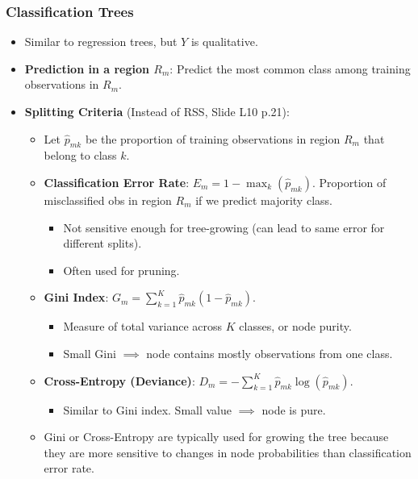 \documentclass[12pt,a4paper]{article}
\begin{document}
\begin{itemize}
    \subsubsection{Classification Trees }
        \begin{itemize}
            \item Similar to regression trees, but $Y$ is qualitative.
            \item \textbf{Prediction in a region $R_m$}: Predict the most common class among training observations in $R_m$.
            \item \textbf{Splitting Criteria} (Instead of RSS, Slide L10 p.21):
                \begin{itemize}
                    \item Let $\hat{p}_{mk}$ be the proportion of training observations in region $R_m$ that belong to class $k$.
                    \item \textbf{Classification Error Rate}: $E_m = 1 - \max_k (\hat{p}_{mk})$. Proportion of misclassified obs in region $R_m$ if we predict majority class.
                        \begin{itemize}
                            \item Not sensitive enough for tree-growing (can lead to same error for different splits).
                            \item Often used for pruning.
                        \end{itemize}
                    \item \textbf{Gini Index}: $G_m = \sum_{k=1}^K \hat{p}_{mk} (1 - \hat{p}_{mk})$.
                        \begin{itemize}
                            \item Measure of total variance across $K$ classes, or node purity.
                            \item Small Gini $\implies$ node contains mostly observations from one class.
                        \end{itemize}
                    \item \textbf{Cross-Entropy (Deviance)}: $D_m = -\sum_{k=1}^K \hat{p}_{mk} \log(\hat{p}_{mk})$.
                        \begin{itemize}
                            \item Similar to Gini index. Small value $\implies$ node is pure.
                        \end{itemize}
                    \item Gini or Cross-Entropy are typically used for growing the tree because they are more sensitive to changes in node probabilities than classification error rate.

\end{itemize}
\end{itemize}
\end{itemize}
\end{document}
